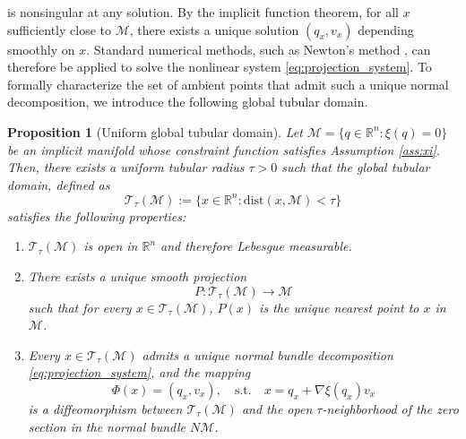 \documentclass[12pt]{article}
\newtheorem{proposition}{Proposition}[section]
\begin{document}
is nonsingular at any solution. By the implicit function theorem, 
for all $x$ sufficiently close to $\mathcal M$, 
there exists a unique solution $(q_x,v_x)$ depending smoothly on $x$.
Standard numerical methods, such as Newton's method \citep{J20},  
can therefore be applied to solve the nonlinear system 
\eqref{eq:projection_system}. To formally characterize the set of ambient points that admit such a unique
normal decomposition, we introduce the following global tubular domain.
\begin{proposition}[Uniform global tubular domain]
\label{prop:maximal_tube}
Let $\mathcal{M} = \{q \in \mathbb{R}^n : \xi(q)=0\}$ be an implicit manifold whose constraint function satisfies Assumption \ref{ass:xi}. Then, there exists a uniform tubular radius $\tau > 0$ such that the global tubular domain, defined as
$$
\mathcal{T}_\tau(\mathcal{M}) := \{x \in \mathbb{R}^n : \mathrm{dist}(x, \mathcal{M}) < \tau\}
$$
satisfies the following properties:
\begin{enumerate}
    \item[(i)] $\mathcal{T}_\tau(\mathcal{M})$ is open in $\mathbb{R}^n$ and therefore Lebesgue measurable.
    \item[(ii)] There exists a unique smooth projection 
    $$
    P: \mathcal{T}_\tau(\mathcal{M}) \to \mathcal{M}
    $$ 
    such that for every $x \in \mathcal{T}_\tau(\mathcal{M})$, $P(x)$ is the unique nearest point to $x$ in $\mathcal{M}$.
    \item[(iii)] Every $x \in \mathcal{T}_\tau(\mathcal{M})$ admits a unique normal bundle decomposition \eqref{eq:projection_system}, and the mapping
    $$
    \Phi(x) = (q_x, v_x), \quad \text{s.t.} \quad x = q_x + \nabla\xi(q_x)v_x
    $$
    is a diffeomorphism between $\mathcal{T}_\tau(\mathcal{M})$ and the open $\tau$-neighborhood of the zero section in the normal bundle $N\mathcal{M}$.
\end{enumerate}
\end{proposition}
\end{document}
